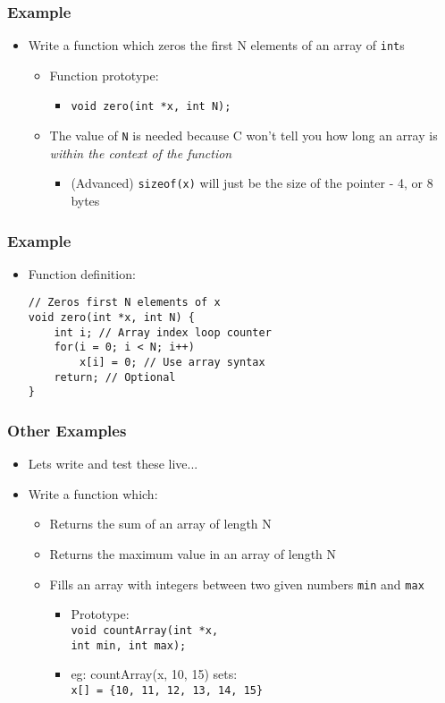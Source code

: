 \documentclass[14pt]{beamer}
\begin{document}
\begin{frame}
\frametitle{Example}
\begin{itemize}
\item Write a function which zeros the first N elements of an array of \texttt{int}s
\begin{itemize}
	\item Function prototype:
	\pause
		\begin{itemize}
			\item \texttt{void zero(int *x, int N);}
		\end{itemize}
	\pause
	\item The value of \texttt{N} is needed because C won't tell you how long an array is \textit{within the context of the function}
		\begin{itemize}
			\item (Advanced) \texttt{sizeof(x)} will just be the size of the pointer -  4, or 8 bytes
		\end{itemize}
	\end{itemize}
\end{itemize}
\end{frame}

\begin{frame}[fragile]
\frametitle{Example}
\begin{itemize}
\item Function definition:
\begin{lstlisting}[style=CStyle]
// Zeros first N elements of x
void zero(int *x, int N) {
	int i; // Array index loop counter
	for(i = 0; i < N; i++)
		x[i] = 0; // Use array syntax
	return; // Optional
}
\end{lstlisting}
\end{itemize}
\end{frame}

\begin{frame}
\frametitle{Other Examples}
\begin{itemize}
\item Lets write and test these live...
\item Write a function which:
	\begin{itemize}	
		\item Returns the sum of an array of length N
		\item Returns the maximum value in an array of length N
		\item Fills an array with integers between two given numbers \texttt{min} and \texttt{max}
			\begin{itemize}
				\item Prototype:\\\texttt{void countArray(int *x,\\\quad \quad \quad \quad int min, int max);}
				\item eg: countArray(x, 10, 15) sets:\\ \texttt{x[] = \{10, 11, 12, 13, 14, 15\}}
			\end{itemize}
	\end{itemize}
\end{itemize}
\end{frame}
\end{document}
